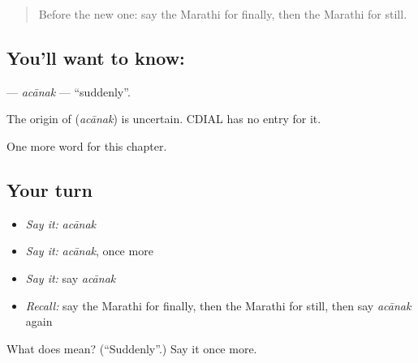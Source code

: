 \label{lesson:MR-C171-acanak}



\begin{quote}
Before the new one: say the Marathi for finally, then the Marathi for still.
\end{quote}

\subsection*{You'll want to know: }
\textbf{} — \emph{acānak} — \textquotedblleft{}suddenly\textquotedblright{}.

\begin{cousinweb}
The origin of \textbf{} (\emph{acānak}) is uncertain. CDIAL has no entry for it.
\end{cousinweb}

\begin{grammarlens}[title={What you've built}]
One more word for this chapter.
\end{grammarlens}

\subsection*{Your turn}
\begin{itemize}
\raggedright
  \item \emph{Say it:} \emph{acānak}
  \item \emph{Say it:} \emph{acānak}, once more
  \item \emph{Say it:} say \emph{acānak}
  \item \emph{Recall:} say the Marathi for finally, then the Marathi for still, then say \emph{acānak} again
\end{itemize}

\begin{tcolorbox}[breakable,colback=teal!4,colframe=teal!35!black,title={Before you move on}]
What does  mean? (\textquotedblleft{}Suddenly\textquotedblright{}.) Say it once more.
\end{tcolorbox}
